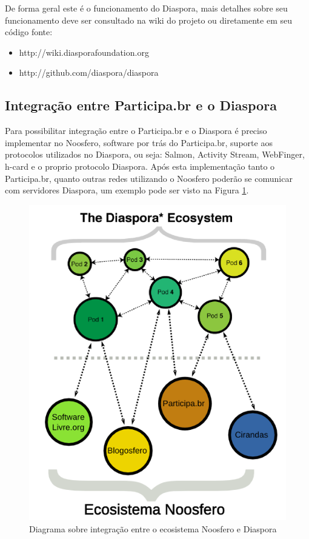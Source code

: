 \documentclass[12pt]{article}
\begin{document}
De forma geral este é o funcionamento do Diaspora, mais detalhes sobre seu
funcionamento deve ser consultado na wiki do projeto ou diretamente em seu
código fonte:

\begin{itemize}
  \item http://wiki.diasporafoundation.org
  \item http://github.com/diaspora/diaspora
\end{itemize}

\subsection{Integração entre Participa.br e o Diaspora}


Para possibilitar integração entre o Participa.br e o Diaspora é preciso
implementar no Noosfero, software por trás do Participa.br, suporte aos
protocolos utilizados no Diaspora, ou seja: Salmon, Activity
Stream, WebFinger, h-card e o proprio protocolo Diaspora. Após esta
implementação tanto o Participa.br, quanto outras redes utilizando o Noosfero
poderão se comunicar com servidores Diaspora, um exemplo pode ser visto na
Figura \ref{ecosistema}.

\begin{figure}[h]
\center
\includegraphics[scale=0.4]{ecosistema-noosfero-diaspora.png}
\caption{Diagrama sobre integração entre o ecosistema Noosfero e Diaspora}
\label{ecosistema}
\end{figure}
\end{document}

